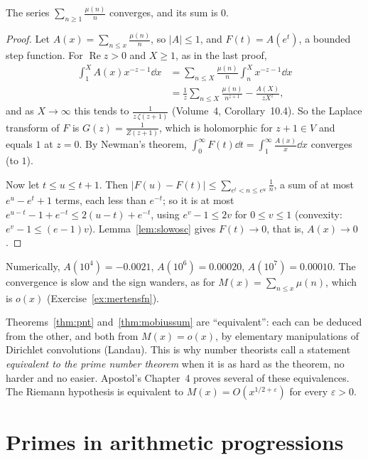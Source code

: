 \begin{theorem}\label{thm:mobiussum}
The series $\sum_{n\ge1}\frac{\mu(n)}n$ converges, and its sum is $0$.
\end{theorem}
\begin{proof}
Let $A(x)=\sum_{n\le x}\frac{\mu(n)}n$, so $|A|\le1$, and $F(t)=A(e^t)$, a bounded step function. For $\operatorname{Re}z>0$ and $X\ge1$, as in the last proof,
\[
\begin{aligned}\int_1^XA(x)x^{-z-1}\dd x&=\sum_{n\le X}\frac{\mu(n)}n\int_n^Xx^{-z-1}\dd x\\&=\frac1z\sum_{n\le X}\frac{\mu(n)}{n^{z+1}}-\frac{A(X)}{zX^z},\end{aligned}
\]
and as $X\to\infty$ this tends to $\frac1{z\,\zeta(z+1)}$ (Volume~4, Corollary~10.4). So the Laplace transform of $F$ is $G(z)=\frac1{Z(z+1)}$, which is holomorphic for $z+1\in V$ and equals $1$
at $z=0$. By Newman's theorem, $\int_0^\infty F(t)\dd t=\int_1^\infty\frac{A(x)}x\dd x$ converges (to $1$).

Now let $t\le u\le t+1$. Then $|F(u)-F(t)|\le\sum_{e^t<n\le e^u}\frac1n$, a sum of at most $e^u-e^t+1$ terms, each less than $e^{-t}$; so it is at most
$e^{u-t}-1+e^{-t}\le2(u-t)+e^{-t}$, using $e^v-1\le2v$ for $0\le v\le1$ (convexity: $e^v-1\le(e-1)v$). Lemma~\ref{lem:slowosc} gives $F(t)\to0$, that is, $A(x)\to0$.
\end{proof}

Numerically, $A(10^4)=-0.0021$, $A(10^6)=0.00020$, $A(10^7)=0.00010$. The convergence is slow and the sign wanders, as for $M(x)=\sum_{n\le x}\mu(n)$, which is $o(x)$
(Exercise~\ref{ex:mertensfn}).

\begin{remark}
Theorems~\ref{thm:pnt} and~\ref{thm:mobiussum} are ``equivalent'': each can be deduced from the other, and both from $M(x)=o(x)$, by elementary manipulations of Dirichlet
convolutions (Landau). This is why number theorists call a statement \emph{equivalent to the prime number theorem} when it is as hard as the theorem, no harder and no easier.
Apostol's Chapter~4 proves several of these equivalences. The Riemann hypothesis is equivalent to $M(x)=O(x^{1/2+\varepsilon})$ for every $\varepsilon>0$.
\end{remark}

\section{Primes in arithmetic progressions}

